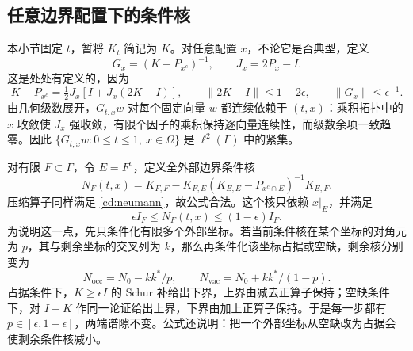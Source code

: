 \documentclass[UTF8,zihao=-4,a4paper]{ctexart}
\numberwithin{equation}{section}
\begin{document}
\subsection{任意边界配置下的条件核}\label{cd:conditional}

本小节固定 $t$，暂将 $K_t$ 简记为 $K$。对任意配置 $x$，不论它是否典型，定义
\begin{equation}
G_x=(K-P_{x^c})^{-1},\qquad J_x=2P_x-I.
\label{cd:inverse}
\end{equation}
这是处处有定义的，因为
\begin{equation}
K-P_{x^c}=\tfrac12J_x[I+J_x(2K-I)],\qquad
\|2K-I\|\le1-2\epsilon,\qquad \|G_x\|\le\epsilon^{-1}.
\label{cd:neumann}
\end{equation}
由几何级数展开，$G_{t,x}w$ 对每个固定向量 $w$ 都连续依赖于 $(t,x)$：乘积拓扑中的 $x$ 收敛使 $J_x$ 强收敛，有限个因子的乘积保持逐向量连续性，而级数余项一致趋零。因此
$\{G_{t,x}w:0\le t\le1,\ x\in\Omega\}$ 是 $\ell^2(\Gamma)$ 中的紧集。

对有限 $F\subset\Gamma$，令 $E=F^c$，定义全外部边界条件核
\begin{equation}
N_F(t,x)=K_{F,F}-K_{F,E}
       (K_{E,E}-P_{x^c\cap E})^{-1}K_{E,F}.
\label{cd:conditionalformula}
\end{equation}
压缩算子同样满足 \eqref{cd:neumann}，故公式合法。这个核只依赖 $x|_E$，并满足
\begin{equation}
\epsilon I_F\le N_F(t,x)\le(1-\epsilon)I_F.
\label{cd:conditionalgap}
\end{equation}
为说明这一点，先只条件化有限多个外部坐标。若当前条件核在某个坐标的对角元为 $p$，其与剩余坐标的交叉列为 $k$，那么再条件化该坐标占据或空缺，剩余核分别变为
\begin{equation}
N_{\mathrm{occ}}=N_0-kk^*/p,\qquad
N_{\mathrm{vac}}=N_0+kk^*/(1-p).
\label{cd:onecondition}
\end{equation}
占据条件下，$K\ge\epsilon I$ 的 Schur 补给出下界，上界由减去正算子保持；空缺条件下，对 $I-K$ 作同一论证给出上界，下界由加上正算子保持。于是每一步都有 $p\in[\epsilon,1-\epsilon]$，两端谱隙不变。公式还说明：把一个外部坐标从空缺改为占据会使剩余条件核减小。
\end{document}
